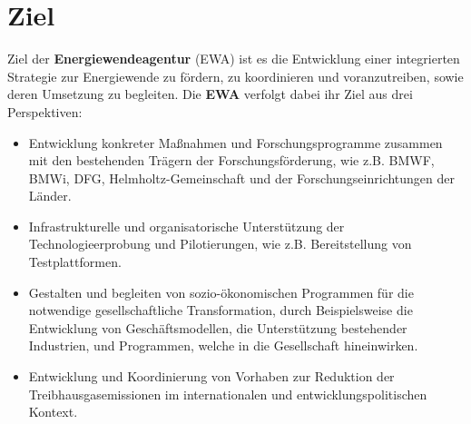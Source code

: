 \section{Ziel}

Ziel der \textbf{Energiewendeagentur} (EWA) ist es die Entwicklung einer integrierten Strategie zur Energiewende zu fördern, zu koordinieren und voranzutreiben, sowie deren Umsetzung zu begleiten.
%
Die \textbf{EWA} verfolgt dabei ihr Ziel aus drei Perspektiven:
\begin{itemize}
	\item Entwicklung konkreter Maßnahmen und Forschungsprogramme zusammen mit den bestehenden Trägern der Forschungsförderung, wie z.B. BMWF, BMWi, DFG, Helmholtz-Gemeinschaft und der Forschungseinrichtungen der Länder.
	\item Infrastrukturelle und organisatorische Unterstützung der Technologieerprobung und Pilotierungen, wie z.B. Bereitstellung von Testplattformen.
	\item Gestalten und begleiten von sozio-ökonomischen Programmen für die notwendige gesellschaftliche Transformation, durch Beispielsweise die Entwicklung von Geschäftsmodellen, die Unterstützung bestehender Industrien, und Programmen, welche in die Gesellschaft hineinwirken.
	\item Entwicklung und Koordinierung von Vorhaben zur Reduktion der Treibhausgasemissionen im internationalen und entwicklungspolitischen Kontext.
\end{itemize}

